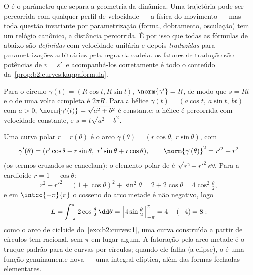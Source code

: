 \begin{remark}
O  é o parâmetro que separa a geometria da
dinâmica. Uma trajetória pode ser percorrida com qualquer perfil
de velocidade --- a física do movimento --- mas toda questão
invariante por parametrização (forma, dobramento,
osculação) tem um relógio canônico, a distância percorrida.
É por isso que todas as fórmulas de  abaixo são \emph{definidas}
com velocidade unitária e depois \emph{traduzidas} para parametrizações
arbitrárias pela regra da cadeia: os fatores de tradução
são potências de $v = s'$, e acompanhá-los corretamente é todo
o conteúdo da~\cref{prop:b2:curves:kappaformula}.
\end{remark}

\begin{example}\label{ex:b2:curves:helix}
Para o círculo $\gamma(t) = (R\cos t, R\sin t)$, $\norm{\gamma'} =
R$, de modo que $s = Rt$ e o  de uma volta completa é $2\pi R$. Para a
hélice $\gamma(t) = (a\cos t,\ a\sin t,\ bt)$ com $a > 0$,
$\norm{\gamma'(t)} = \sqrt{a^2 + b^2}$ é constante: a hélice é
percorrida com velocidade constante, e $s = t\sqrt{a^2 + b^2}$.
\end{example}

\begin{example}\label{ex:b2:curves:polarlength}
Uma curva polar $r = r(\theta)$ é o arco $\gamma(\theta) =
(r\cos\theta,\ r\sin\theta)$, com
\[
\gamma'(\theta) = (r'\cos\theta - r\sin\theta,\
r'\sin\theta + r\cos\theta),
\qquad
\norm{\gamma'(\theta)}^2 = r'^2 + r^2
\]
(os termos cruzados se cancelam): o elemento polar de  é
$\sqrt{r^2 + r'^2}\,\dd\theta$. Para a cardioide $r = 1 +
\cos\theta$:
\[
r^2 + r'^2 = (1 + \cos\theta)^2 + \sin^2\theta = 2 +
2\cos\theta = 4\cos^2\tfrac\theta2,
\]
e em $\intcc{-\pi}{\pi}$ o cosseno do arco metade é
não negativo, logo
\[
L = \int_{-\pi}^{\pi}2\cos\tfrac\theta2\,\dd\theta
= \Bigl[4\sin\tfrac\theta2\Bigr]_{-\pi}^{\pi}
= 4 - (-4) = 8 :
\]
como o arco de cicloide do~\cref{exo:b2:curves:1}, uma curva
construída a partir de círculos tem  racional, sem $\pi$
em lugar algum. A fatoração pelo arco metade é o truque padrão
para  de curvas  por círculos; quando ele falha (a
elipse), o \omterm{def:b2:curves:length}{comprimento} é uma função genuinamente nova --- uma
integral elíptica, além das formas fechadas elementares.
\end{example}

